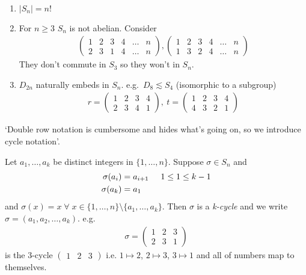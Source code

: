 \begin{remark} ~
\begin{enumerate}
\def\labelenumi{\roman{enumi}.}
\item
  $|S_n| = n!$
\item
  For $n \geq 3$ $S_n$ is not abelian.
  Consider
  \begin{align*}
  \begin{pmatrix}
  1 & 2 & 3 & 4 & \dots & n \\
  2 & 3 & 1 & 4 & \dots & n
  \end{pmatrix}, 
  \begin{pmatrix}
      1 & 2 & 3 & 4 & \dots & n \\
      1 & 3 & 2 & 4 & \dots & n
  \end{pmatrix}
  \end{align*}
  They don't commute in $S_3$ so they won't in $S_n$.
\item
  $D_{2n}$ naturally embeds in $S_n$.
  e.g.~$D_8 \lesssim S_4$ (isomorphic to a subgroup)
  \begin{align*}
      r = \begin{pmatrix}
      1 & 2 & 3 & 4 \\
      2 & 3 & 4 & 1
      \end{pmatrix},\ t = 
      \begin{pmatrix}
      1 & 2 & 3 & 4 \\
      4 & 3 & 2 & 1
      \end{pmatrix}
  \end{align*}
\end{enumerate}

\end{remark}

`Double row notation is cumbersome and hides what's going on, so we introduce cycle notation'.

\begin{definition}
Let $a_1, \dots, a_k$ be distinct integers in $\{ 1, \dots, n \}$.
Suppose $\sigma \in S_n$ and
\begin{align*}
    \sigma(a_i) &= a_{i + 1} \hspace{0.5cm} 1 \leq 1 \leq k - 1 \\
    \sigma(a_k) &= a_1
\end{align*}
and $\sigma(x) = x \; \forall \; x \in \{ 1, \dots, n \} \setminus \{ a_1, \dots, a_k \}$.
Then $\sigma$ is a \emph{k-cycle} and we write $\sigma = (a_1, a_2, \dots, a_k)$.
e.g.~\begin{align*}
    \sigma = \begin{pmatrix}
    1 & 2 & 3 \\
    2 & 3 & 1
    \end{pmatrix}
\end{align*} is the 3-cycle $\begin{pmatrix}1 & 2 & 3\end{pmatrix}$ i.e. $1 \mapsto 2$, $2\mapsto 3$, $3\mapsto 1$ and all of numbers map to themselves.
\end{definition}

